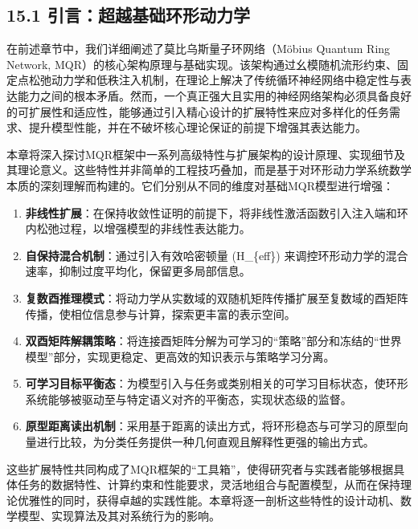 \documentclass[
  12pt,
]{article}
\providecommand{\tightlist}{%
  \setlength{\itemsep}{0pt}\setlength{\parskip}{0pt}}
\begin{document}
\hypertarget{ux5f15ux8a00ux8d85ux8d8aux57faux7840ux73afux5f62ux52a8ux529bux5b66}{%
\subsection{15.1
引言：超越基础环形动力学}\label{ux5f15ux8a00ux8d85ux8d8aux57faux7840ux73afux5f62ux52a8ux529bux5b66}}

在前述章节中，我们详细阐述了莫比乌斯量子环网络（Möbius Quantum Ring
Network,
MQR）的核心架构原理与基础实现。该架构通过幺模随机流形约束、固定点松弛动力学和低秩注入机制，在理论上解决了传统循环神经网络中稳定性与表达能力之间的根本矛盾。然而，一个真正强大且实用的神经网络架构必须具备良好的可扩展性和适应性，能够通过引入精心设计的扩展特性来应对多样化的任务需求、提升模型性能，并在不破坏核心理论保证的前提下增强其表达能力。

本章将深入探讨MQR框架中一系列高级特性与扩展架构的设计原理、实现细节及其理论意义。这些特性并非简单的工程技巧叠加，而是基于对环形动力学系统数学本质的深刻理解而构建的。它们分别从不同的维度对基础MQR模型进行增强：

\begin{enumerate}
\def\labelenumi{\arabic{enumi}.}
\tightlist
\item
  \textbf{非线性扩展}：在保持收敛性证明的前提下，将非线性激活函数引入注入端和环内松弛过程，以增强模型的非线性表达能力。
\item
  \textbf{自保持混合机制}：通过引入有效哈密顿量 (H\_\{eff\})
  来调控环形动力学的混合速率，抑制过度平均化，保留更多局部信息。
\item
  \textbf{复数酉推理模式}：将动力学从实数域的双随机矩阵传播扩展至复数域的酉矩阵传播，使相位信息参与计算，探索更丰富的表示空间。
\item
  \textbf{双酉矩阵解耦策略}：将连接酉矩阵分解为可学习的``策略''部分和冻结的``世界模型''部分，实现更稳定、更高效的知识表示与策略学习分离。
\item
  \textbf{可学习目标平衡态}：为模型引入与任务或类别相关的可学习目标状态，使环形系统能够被驱动至与特定语义对齐的平衡态，实现状态级的监督。
\item
  \textbf{原型距离读出机制}：采用基于距离的读出方式，将环形稳态与可学习的原型向量进行比较，为分类任务提供一种几何直观且解释性更强的输出方式。
\end{enumerate}

这些扩展特性共同构成了MQR框架的``工具箱''，使得研究者与实践者能够根据具体任务的数据特性、计算约束和性能要求，灵活地组合与配置模型，从而在保持理论优雅性的同时，获得卓越的实践性能。本章将逐一剖析这些特性的设计动机、数学模型、实现算法及其对系统行为的影响。
\end{document}
